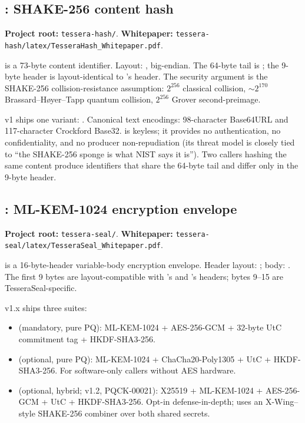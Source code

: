 \subsection{\tesserahash{}: SHAKE-256 content hash}

\textbf{Project root:} \texttt{tessera-hash/}. \textbf{Whitepaper:} \texttt{tessera-hash/latex/TesseraHash\_Whitepaper.pdf}.

\tesserahash{} is a 73-byte content identifier. Layout: , big-endian. The 64-byte tail is  \citep{fips202}; the 9-byte header is layout-identical to \tesseraid{}'s header. The security argument is the SHAKE-256 collision-resistance assumption: $2^{256}$ classical collision, $\sim 2^{170}$ Brassard--H{\o}yer--Tapp \citep{bht1998} quantum collision, $2^{256}$ Grover second-preimage.

\tesserahash{} v1 ships one variant: . Canonical text encodings: 98-character Base64URL and 117-character Crockford Base32. \tesserahash{} is keyless; it provides no authentication, no confidentiality, and no producer non-repudiation (its threat model is closely tied to ``the SHAKE-256 sponge is what NIST says it is''). Two callers hashing the same content produce identifiers that share the 64-byte tail and differ only in the 9-byte header.

\subsection{\tesseraseal{}: ML-KEM-1024 encryption envelope}

\textbf{Project root:} \texttt{tessera-seal/}. \textbf{Whitepaper:} \texttt{tessera-seal/latex/TesseraSeal\_Whitepaper.pdf}.

\tesseraseal{} is a 16-byte-header variable-body encryption envelope. Header layout: ; body: . The first 9 bytes are layout-compatible with \tesseraid{}'s and \tesserahash{}'s headers; bytes 9--15 are TesseraSeal-specific.

\tesseraseal{} v1.x ships three suites:
\begin{itemize}
\item {} (mandatory, pure PQ): ML-KEM-1024 + AES-256-GCM + 32-byte UtC commitment tag \citep{bellare2022commitment} + HKDF-SHA3-256.
\item {} (optional, pure PQ): ML-KEM-1024 + ChaCha20-Poly1305 + UtC + HKDF-SHA3-256. For software-only callers without AES hardware.
\item {} (optional, hybrid; v1.2, PQCK-00021): X25519 \citep{rfc7748} + ML-KEM-1024 + AES-256-GCM + UtC + HKDF-SHA3-256. Opt-in defense-in-depth; uses an X-Wing--style \citep{xwing-draft} SHAKE-256 combiner over both shared secrets.
\end{itemize}

